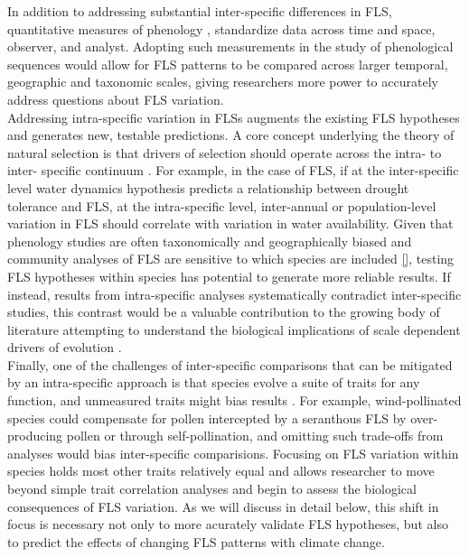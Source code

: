 \documentclass{article}
\begin{document}
{\noindent In addition to addressing substantial inter-specific differences in FLS, quantitative measures of phenology \citep[e.g. the BBCH scale,][]{Finn2007}, standardize data across time and space, observer, and analyst. Adopting such measurements in the study of phenological sequences would allow for FLS patterns to be compared across larger temporal, geographic and taxonomic scales, giving researchers more power to accurately address questions about FLS variation.\\

\noindent Addressing intra-specific variation in FLSs augments the existing FLS hypotheses and generates new, testable predictions. A core concept underlying the theory of natural selection is that drivers of selection should operate across the intra- to inter- specific continuum \citep{}. For example, in the case of FLS, if at the inter-specific level water dynamics hypothesis predicts a relationship between drought tolerance and FLS, at the intra-specific level, inter-annual or population-level variation in FLS should correlate with variation in water availability. Given that phenology studies are often taxonomically and geographically biased \citep{} and community analyses of FLS are sensitive to which species are included \ref{}, testing FLS hypotheses within species has potential to generate more reliable results. If instead, results from intra-specific analyses systematically contradict inter-specific studies, this contrast would be a valuable contribution to the growing body of literature attempting to understand the biological implications of scale dependent drivers of evolution \citep[e.g.,][]{}.  \\
 
\noindent Finally, one of the challenges of inter-specific comparisons that can be mitigated by an intra-specific approach is that species evolve a suite of traits for any function, and unmeasured traits might bias results \citep{Davies2019}. For example, wind-pollinated species could compensate for pollen intercepted by a seranthous FLS by over-producing pollen or through self-pollination, and omitting such trade-offs from analyses would bias inter-specific comparisions. Focusing on FLS variation within species holds most other traits relatively equal and allows researcher to move beyond simple trait correlation analyses and begin to assess the biological consequences of FLS variation. As we will discuss in detail below, this shift in focus is necessary not only to more acurately validate FLS hypotheses, but also to predict the effects of changing FLS patterns with climate change. \\


}
\end{document}
